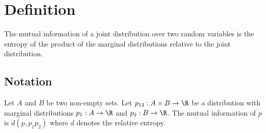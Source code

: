 
\section*{Definition}

The mutual information of a joint distribution over two random variables is the entropy of the product of the marginal distributions relative to the joint distribution.

\subsection*{Notation}

Let $A$ and $B$ be two non-empty sets.
Let $p_{12}: A \times  B \to \R $ be a distribution with marginal distributions $p_1: A \to \R $ and $p_2: B \to \R $.
The mutual information of $p$ is $d(p, p_1p_2)$ where $d$ denotes the relative entropy.

\blankpage